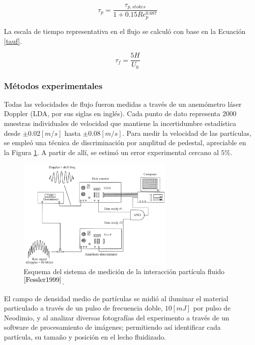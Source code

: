 \begin{equation}
	\tau _p = \frac{\tau _{p, stokes}}{1 + 0.15 Re_p ^{0.687}}
	\label{taup}
\end{equation}

\noindent
\justify

La escala de tiempo representativa en el flujo se calcul\'o con base en la Ecuaci\'on \ref{tauf}.

\begin{equation}
	\tau _f = \frac{5H}{U_0}
	\label{tauf}
\end{equation}

\subsubsection{M\'etodos experimentales}

\noindent
\justify

Todas las velocidades de flujo fueron medidas a trav\'es de un anem\'ometro l\'aser Doppler (LDA, por sus siglas en ingl\'es). Cada punto de dato representa 2000 muestras individuales de velocidad que mantiene la incertidumbre estad\'istica desde $\pm 0.02 [m/s]$ hasta $\pm 0.08 [m/s]$. Para medir la velocidad de las part\'iculas, se emple\'o una t\'ecnica de discriminaci\'on por amplitud de pedestal, apreciable en la Figura \ref{medicion}. A partir de all\'i, se estim\'o un error experimental cercano al $5\%$. 

\begin{figure}[h!]
	\centering
	\includegraphics[width=0.68\textwidth]{Images/pedestal.png}
	\caption{Esquema del sistema de medici\'on de la interacci\'on part\'icula fluido$^{\cite{Fessler1999}}$.}
	\label{medicion}
\end{figure}

\noindent
\justify

El campo de densidad medio de part\'iculas se midi\'o al iluminar el material particulado a trav\'es de un pulso de frecuencia doble, $10 [mJ]$ por pulso de Neodimio, y al analizar diversas fotograf\'ias del experimento a trav\'es de un software de procesamiento de im\'agenes; permitiendo as\'i identificar cada part\'icula, su tama\~no y posici\'on en el lecho fluidizado.

